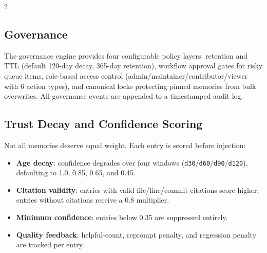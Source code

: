 \documentclass[10pt]{article}
\begin{document}
\begin{multicols}{2}
\subsection{Governance}
\label{sec:governance}
The governance engine \cite{cortex-shared} provides four configurable policy layers: retention and TTL (default 120-day decay, 365-day retention), workflow approval gates for risky queue items, role-based access control (admin/maintainer/contributor/viewer with 6 action types), and canonical locks protecting pinned memories from bulk overwrites. All governance events are appended to a timestamped audit log.

\subsection{Trust Decay and Confidence Scoring}
\label{sec:decay}

Not all memories deserve equal weight. Each entry is scored before injection:
\begin{itemize}
  \item \textbf{Age decay}: confidence degrades over four windows (\texttt{d30}/\texttt{d60}/\texttt{d90}/\texttt{d120}), defaulting to 1.0, 0.85, 0.65, and 0.45.
  \item \textbf{Citation validity}: entries with valid file/line/commit citations score higher; entries without citations receive a 0.8 multiplier.
  \item \textbf{Minimum confidence}: entries below 0.35 are suppressed entirely.
  \item \textbf{Quality feedback}: helpful-count, reprompt penalty, and regression penalty are tracked per entry.
\end{itemize}


\end{multicols}
\end{document}
